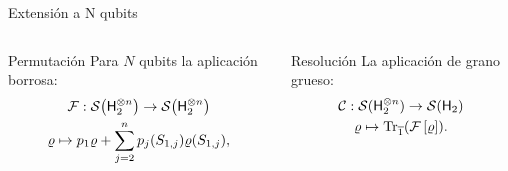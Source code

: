 \begin{frame}{Extensión a N qubits}
    \begin{columns}
        \begin{column}{0.5\textwidth}
            \begin{block}{Permutación}
            Para $N$ qubits la aplicación borrosa\pause:
            \begin{equation}
                \begin{gathered}
                \mathcal{F}:\mathcal{S}\qty( {\sf H}_{2}^{\otimes n})\to \mathcal{S}\qty( {\sf H}_{2}^{\otimes n})\nonumber\\
                \varrho \mapsto p_{1}\varrho+\sum_{j=2}^{n}p_{j}(S_{1,j})\varrho(S_{1,j}),\nonumber
            \end{gathered}\nonumber
        \end{equation}
    \end{block}
        \end{column}
        \pause
        \begin{column}{0.5\textwidth}
            \begin{block}{Resolución}
        La aplicación de grano grueso\pause:
        \begin{equation}
            \begin{gathered}
                \mathcal{C}:\mathcal{S}( {\sf H}_{2}^{\otimes n})\to \mathcal{S}({\sf H}_{2})\\
                \varrho\mapsto\Tr_{\overline{1}}(\mathcal{F}\left[\varrho\right]).
            \end{gathered}\nonumber
        \end{equation}
    \end{block}
        \end{column}
    \end{columns}
\end{frame}


